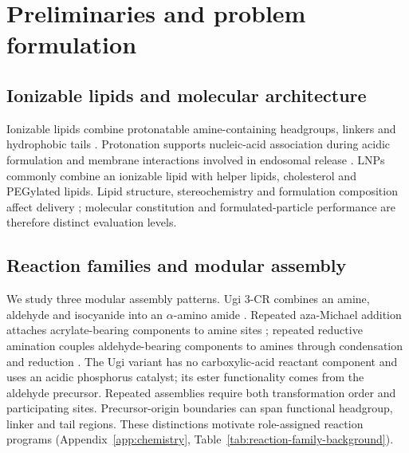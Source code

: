 \documentclass{article}
\theoremstyle{definition}
\begin{document}
\section{Preliminaries and problem formulation}
\label{sec:preliminaries}

\subsection{Ionizable lipids and molecular architecture}
\label{sec:lipid-background}
Ionizable lipids combine protonatable amine-containing headgroups, linkers and hydrophobic tails
\citep{semple2010rational,jayaraman2012maximizing}. Protonation supports nucleic-acid association
during acidic formulation and membrane interactions involved in endosomal release
\citep{xu2024agile}. LNPs commonly combine an ionizable lipid with helper lipids, cholesterol and
PEGylated lipids. Lipid structure, stereochemistry and formulation composition affect delivery
\citep{han2021ionizable,hatit2023nanoparticle,cheng2020selective}; molecular constitution and
formulated-particle performance are therefore distinct evaluation levels.

\subsection{Reaction families and modular assembly}
\label{sec:reaction-background}
We study three modular assembly patterns. Ugi 3-CR combines an amine, aldehyde and
isocyanide into an $\alpha$-amino amide \citep{xu2024agile}. Repeated aza-Michael addition attaches
acrylate-bearing components to amine sites \citep{li2023combinatorial}; repeated reductive amination
couples aldehyde-bearing components to amines through condensation and reduction
\citep{xue2024barcoding}. The Ugi variant has no carboxylic-acid reactant component and uses an
acidic phosphorus catalyst; its ester functionality comes from the aldehyde precursor.
Repeated assemblies require both transformation order and participating sites. Precursor-origin
boundaries can span functional headgroup, linker and tail regions. These distinctions motivate
role-assigned reaction programs (Appendix~\ref{app:chemistry}, Table~\ref{tab:reaction-family-background}).
\end{document}

